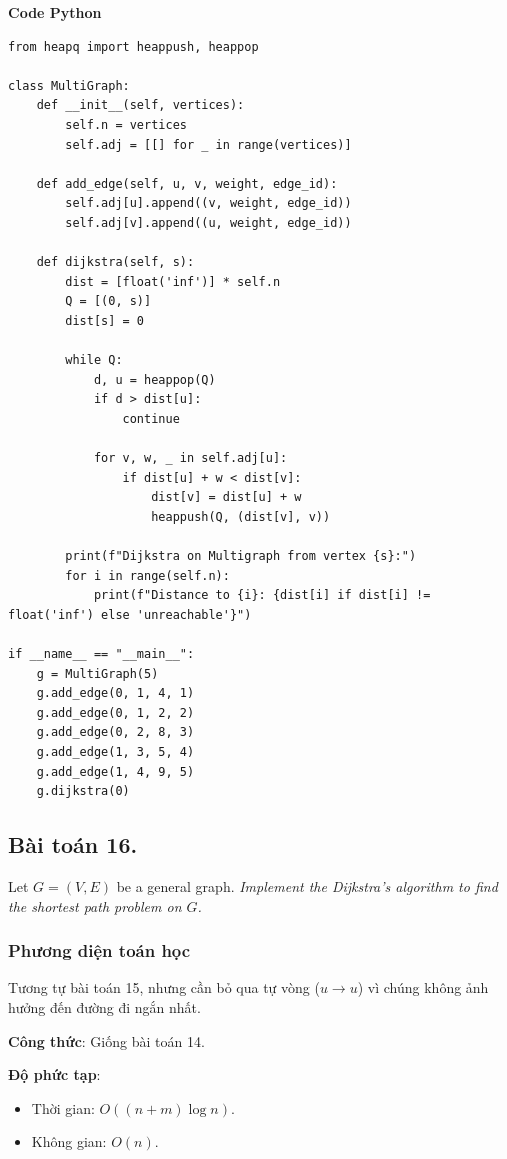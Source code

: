 \documentclass[a4paper,12pt]{article}
\begin{document}
\textbf{Code Python}
\lstset{language=Python}
\begin{lstlisting}
from heapq import heappush, heappop

class MultiGraph:
    def __init__(self, vertices):
        self.n = vertices
        self.adj = [[] for _ in range(vertices)]

    def add_edge(self, u, v, weight, edge_id):
        self.adj[u].append((v, weight, edge_id))
        self.adj[v].append((u, weight, edge_id))

    def dijkstra(self, s):
        dist = [float('inf')] * self.n
        Q = [(0, s)]
        dist[s] = 0

        while Q:
            d, u = heappop(Q)
            if d > dist[u]:
                continue

            for v, w, _ in self.adj[u]:
                if dist[u] + w < dist[v]:
                    dist[v] = dist[u] + w
                    heappush(Q, (dist[v], v))

        print(f"Dijkstra on Multigraph from vertex {s}:")
        for i in range(self.n):
            print(f"Distance to {i}: {dist[i] if dist[i] != float('inf') else 'unreachable'}")

if __name__ == "__main__":
    g = MultiGraph(5)
    g.add_edge(0, 1, 4, 1)
    g.add_edge(0, 1, 2, 2)
    g.add_edge(0, 2, 8, 3)
    g.add_edge(1, 3, 5, 4)
    g.add_edge(1, 4, 9, 5)
    g.dijkstra(0)
\end{lstlisting}

\subsection{Bài toán 16.} Let $G = (V, E)$ be a general graph. \textit{Implement the Dijkstra’s algorithm to find the shortest path problem on $G$.}

\subsubsection{Phương diện toán học}
Tương tự bài toán 15, nhưng cần bỏ qua tự vòng (\( u \to u \)) vì chúng không ảnh hưởng đến đường đi ngắn nhất.

\textbf{Công thức}: Giống bài toán 14.

\textbf{Độ phức tạp}: 
\begin{itemize}
    \item Thời gian: \( O((n + m) \log n) \).
    \item Không gian: \( O(n) \).
\end{itemize}
\end{document}
